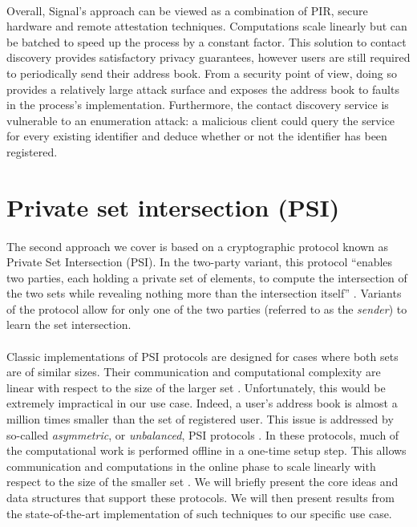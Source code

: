 \paragraph{} Overall, Signal's approach can be viewed as a combination of PIR, secure hardware and remote attestation techniques. Computations scale linearly but can be batched to speed up the process by a constant factor. This solution to contact discovery provides satisfactory privacy guarantees, however users are still required to periodically send their address book. From a security point of view, doing so provides a relatively large attack surface and exposes the address book to faults in the process's implementation. Furthermore, the contact discovery service is vulnerable to an enumeration attack: a malicious client could query the service for every existing identifier and deduce whether or not the identifier has been registered.






\section{Private set intersection (PSI)}
\label{sec:PSI}


\paragraph{} The second approach we cover is based on a cryptographic protocol known as Private Set Intersection (PSI). In the two-party variant, this protocol ``enables two parties, each holding a private set of elements, to compute the intersection of the two sets while revealing nothing more than the intersection itself'' \cite{Chase2020}.  Variants of the protocol allow for only one of the two parties (referred to as the \textit{sender}) to learn the set intersection.

\paragraph{} Classic implementations of PSI protocols are designed for cases where both sets are of similar sizes. Their communication and computational complexity are linear with respect to the size of the larger set \cite{Kales19}. Unfortunately, this would be extremely impractical in our use case. Indeed, a user's address book is almost a million times smaller than the set of registered user. This issue is addressed by so-called \textit{asymmetric}, or \textit{unbalanced}, PSI protocols \cite{Chen2017,Demmler2018,Kales19,Kiss2017}. In these protocols, much of the computational work is performed offline in a one-time setup step. This allows communication and computations in the online phase to scale linearly with respect to the size of the smaller set \cite{Kales19}. We will briefly present the core ideas and data structures that support these protocols. We will then present results from the state-of-the-art implementation of such techniques to our specific use case.

